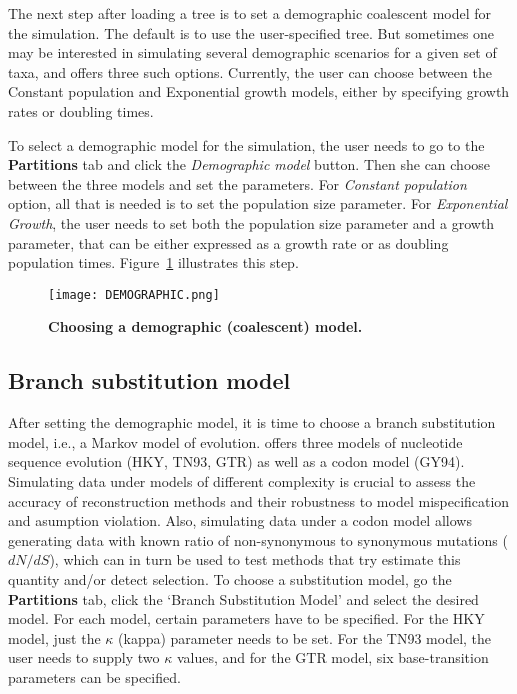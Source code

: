 The next step after loading a tree is to set a demographic coalescent model for the simulation. 
The default is to use the user-specified  tree. But sometimes one may be interested in simulating several demographic scenarios for a given set of taxa, and {\bussname} offers three such options. Currently, the user can choose between the Constant population and Exponential growth models, either by specifying growth rates or doubling times.%

To select a demographic model for the simulation, the user needs to go to the \textbf{Partitions} tab and click  the \emph{Demographic model} button. 
Then she can choose between the three models and set the parameters. 
For \emph{Constant population} option, all that is needed is to set the population size parameter. 
For \emph{Exponential Growth}, the user needs to set both the population size parameter and a growth parameter, that can be either expressed as a growth rate or as doubling population times. 
Figure~\ref{fig:demographic} illustrates this step.

\begin{figure}[h!]
\centering
\texttt{[image: DEMOGRAPHIC.png]} 
\caption{
{ \footnotesize 
{\bf Choosing a demographic (coalescent) model.}
} %
}
\label{fig:demographic}
\end{figure}

\subsection{Branch substitution model}

After setting the demographic model, it is time to choose a branch substitution model, i.e., a Markov model of evolution. 
{\bussname} offers three models of nucleotide sequence evolution (HKY, TN93, GTR) as well as a codon model (GY94). 
Simulating data under models of different complexity is crucial to assess the accuracy of reconstruction methods and their robustness to model mispecification and asumption violation. 
Also, simulating data under a codon model allows generating data with known ratio of non-synonymous to synonymous mutations ($dN/dS$), which can in turn be used to test methods that try estimate this quantity and/or detect selection.
To choose a substitution model, go the \textbf{Partitions} tab, click the `Branch Substitution Model' and select the desired model. 
For each model, certain parameters have to be specified. 
For the HKY model, just the $\kappa$ (kappa) parameter needs to be set. 
For the TN93 model, the user needs to supply two $\kappa$ values, and for the GTR model, six base-transition parameters can be specified.

